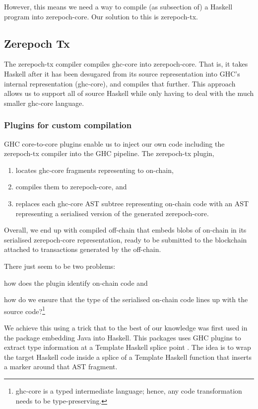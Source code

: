 However, this means we need a way to compile (as subsection of) a Haskell program into \gls{zerepoch-core}.
Our solution to this is \gls{zerepoch-tx}.

\subsection{Zerepoch Tx}
\label{sec:zerepoch-tx}

The \gls{zerepoch-tx} compiler compiles \gls{ghc-core} into \gls{zerepoch-core}.
That is, it takes Haskell after it has been desugared from its source representation into GHC's internal representation (\gls{ghc-core}), and compiles that further.
This approach allows us to support all of source Haskell while only having to deal with the much smaller \gls{ghc-core} language.

\subsubsection{Plugins for custom compilation}

GHC core-to-core plugins enable us to inject our own code including the \gls{zerepoch-tx} compiler into the GHC pipeline.
The \gls{zerepoch-tx} plugin,
\begin{enumerate}
\item locates \gls{ghc-core} fragments representing to \gls{on-chain},
\item compiles them to \gls{zerepoch-core}, and
\item replaces each \gls{ghc-core} AST subtree representing \gls{on-chain} code with an AST representing a serialised version of the generated \gls{zerepoch-core}.
\end{enumerate}

Overall, we end up with compiled \gls{off-chain} that embeds blobs of \gls{on-chain} in its serialised \gls{zerepoch-core} representation, ready to be submitted to the blockchain attached to transactions generated by the \gls{off-chain}.

There just seem to be two problems:
\begin{inparaenum}
\item how does the plugin identify on-chain code and
\item how do we ensure that the type of the serialised on-chain code lines up with the source code?\footnote{
\Gls{ghc-core} is a typed intermediate language; hence, any code transformation needs to be type-preserving.
}
\end{inparaenum}
We achieve this using a trick that to the best of our knowledge was first used in the  package embedding Java into Haskell.
This packages uses GHC plugins to extract type information at a Template Haskell splice point \autocite{inline-java-blog-post}.
The idea is to wrap the target Haskell code inside a splice of a Template Haskell function that inserts a marker around that AST fragment.

